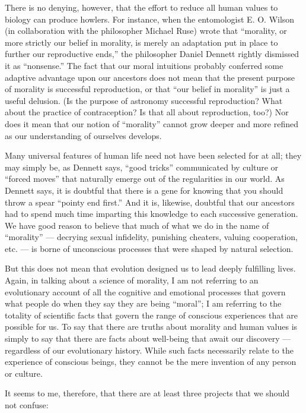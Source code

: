 \documentclass[a4paper,14pt]{extarticle}
\begin{document}
There is no denying, however, that the effort to reduce all human values to biology can produce howlers.
For instance, when the entomologist E. O. Wilson (in collaboration with the philosopher Michael Ruse) wrote that ``morality, or more strictly our belief in morality, is merely an adaptation put in place to further our reproductive ends,'' the philosopher Daniel Dennett rightly dismissed it as ``nonsense.''
The fact that our moral intuitions probably conferred some adaptive advantage upon our ancestors does not mean that the present purpose of morality is successful reproduction, or that ``our belief in morality'' is just a useful delusion.
(Is the purpose of astronomy successful reproduction?
What about the practice of contraception?
Is that all about reproduction, too?)
Nor does it mean that our notion of ``morality'' cannot grow deeper and more refined as our understanding of ourselves develops.

Many universal features of human life need not have been selected for at all;
they may simply be, as Dennett says, ``good tricks'' communicated by culture or ``forced moves'' that naturally emerge out of the regularities in our world.
As Dennett says, it is doubtful that there is a gene for knowing that you should throw a spear ``pointy end first.''
And it is, likewise, doubtful that our ancestors had to spend much time imparting this knowledge to each successive generation.
We have good reason to believe that much of what we do in the name of ``morality'' --- decrying sexual infidelity, punishing cheaters, valuing cooperation, etc. --- is borne of unconscious processes that were shaped by natural selection.

But this does not mean that evolution designed us to lead deeply fulfilling lives.
Again, in talking about a science of morality, I am not referring to an evolutionary account of all the cognitive and emotional processes that govern what people do when they say they are being ``moral'';
I am referring to the totality of scientific facts that govern the range of conscious experiences that are possible for us.
To say that there are truths about morality and human values is simply to say that there are facts about well-being that await our discovery --- regardless of our evolutionary history.
While such facts necessarily relate to the experience of conscious beings, they cannot be the mere invention of any person or culture.

It seems to me, therefore, that there are at least three projects that we should not confuse:
\end{document}
